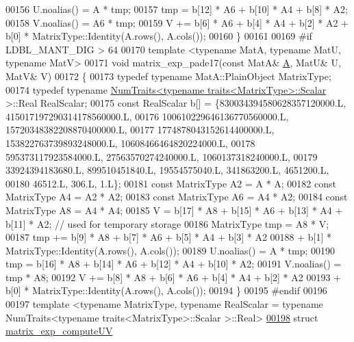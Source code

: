 \begin{DoxyCode}
00156   U.noalias() = A * tmp;
00157   tmp = b[12] * A6 + b[10] * A4 + b[8] * A2;
00158   V.noalias() = A6 * tmp;
00159   V += b[6] * A6 + b[4] * A4 + b[2] * A2 + b[0] * MatrixType::Identity(A.rows(), A.cols());
00160 \}
00161 
00169 \textcolor{preprocessor}{#if LDBL\_MANT\_DIG > 64}
00170 \textcolor{keyword}{template} <\textcolor{keyword}{typename} MatA, \textcolor{keyword}{typename} MatU, \textcolor{keyword}{typename} MatV>
00171 \textcolor{keywordtype}{void} matrix\_exp\_pade17(\textcolor{keyword}{const} MatA& \hyperlink{group___core___module_class_eigen_1_1_matrix}{A}, MatU& U, MatV& V)
00172 \{
00173   \textcolor{keyword}{typedef} \textcolor{keyword}{typename} MatA::PlainObject MatrixType;
00174   \textcolor{keyword}{typedef} \textcolor{keyword}{typename} \hyperlink{group___core___module_struct_eigen_1_1_num_traits}{NumTraits<typename traits<MatrixType>::Scalar}
      >::Real RealScalar;
00175   \textcolor{keyword}{const} RealScalar b[] = \{830034394580628357120000.L, 415017197290314178560000.L,
00176                           100610229646136770560000.L, 15720348382208870400000.L,
00177                           1774878043152614400000.L, 153822763739893248000.L, 10608466464820224000.L,
00178                           595373117923584000.L, 27563570274240000.L, 1060137318240000.L,
00179                           33924394183680.L, 899510451840.L, 19554575040.L, 341863200.L, 4651200.L,
00180                           46512.L, 306.L, 1.L\};
00181   \textcolor{keyword}{const} MatrixType A2 = A * A;
00182   \textcolor{keyword}{const} MatrixType A4 = A2 * A2;
00183   \textcolor{keyword}{const} MatrixType A6 = A4 * A2;
00184   \textcolor{keyword}{const} MatrixType A8 = A4 * A4;
00185   V = b[17] * A8 + b[15] * A6 + b[13] * A4 + b[11] * A2; \textcolor{comment}{// used for temporary storage}
00186   MatrixType tmp = A8 * V;
00187   tmp += b[9] * A8 + b[7] * A6 + b[5] * A4 + b[3] * A2 
00188     + b[1] * MatrixType::Identity(A.rows(), A.cols());
00189   U.noalias() = A * tmp;
00190   tmp = b[16] * A8 + b[14] * A6 + b[12] * A4 + b[10] * A2;
00191   V.noalias() = tmp * A8;
00192   V += b[8] * A8 + b[6] * A6 + b[4] * A4 + b[2] * A2 
00193     + b[0] * MatrixType::Identity(A.rows(), A.cols());
00194 \}
00195 \textcolor{preprocessor}{#endif}
00196 
00197 template <typename MatrixType, typename RealScalar = typename NumTraits<typename traits<MatrixType>::Scalar
      >::Real>
\hyperlink{struct_eigen_1_1internal_1_1matrix__exp__compute_u_v}{00198} \textcolor{keyword}{struct }\hyperlink{struct_eigen_1_1internal_1_1matrix__exp__compute_u_v}{matrix\_exp\_computeUV}

\end{DoxyCode}
